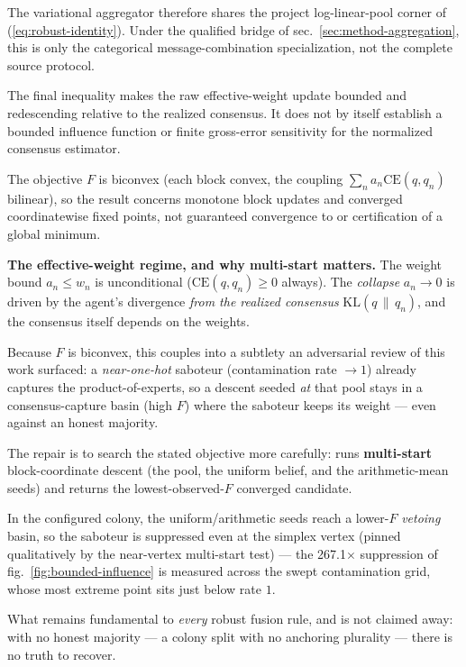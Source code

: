 \documentclass[
  english,
]{article}
\theoremstyle{plain}
\theoremstyle{definition}
\theoremstyle{remark}
\theoremstyle{definition}
\begin{document}
The variational aggregator therefore shares the project log-linear-pool
corner of (\ref{eq:robust-identity}). Under the qualified bridge of
sec.~\ref{sec:method-aggregation}, this is only the categorical
message-combination specialization, not the complete source protocol.

The final inequality makes the raw effective-weight update bounded and
redescending relative to the realized consensus. It does not by itself
establish a bounded influence function or finite gross-error sensitivity
for the normalized consensus estimator.

The objective \(F\) is biconvex (each block convex, the coupling
\(\sum_n a_n\mathrm{CE}(q,q_n)\) bilinear), so the result concerns
monotone block updates and converged coordinatewise fixed points, not
guaranteed convergence to or certification of a global minimum.

\textbf{The effective-weight regime, and why multi-start matters.} The
weight bound \(a_n \le w_n\) is unconditional
(\(\mathrm{CE}(q,q_n)\ge 0\) always). The \emph{collapse} \(a_n \to 0\)
is driven by the agent's divergence \emph{from the realized consensus}
\(\mathrm{KL}(q\,\|\,q_n)\), and the consensus itself depends on the
weights.

Because \(F\) is biconvex, this couples into a subtlety an adversarial
review of this work surfaced: a \emph{near-one-hot} saboteur
(contamination rate \(\to 1\)) already captures the product-of-experts,
so a descent seeded \emph{at} that pool stays in a consensus-capture
basin (high \(F\)) where the saboteur keeps its weight --- even against
an honest majority.

The repair is to search the stated objective more carefully:
 runs \textbf{multi-start}
block-coordinate descent (the pool, the uniform belief, and the
arithmetic-mean seeds) and returns the lowest-observed-\(F\) converged
candidate.

In the configured colony, the uniform/arithmetic seeds reach a
lower-\(F\) \emph{vetoing} basin, so the saboteur is suppressed even at
the simplex vertex (pinned qualitatively by the near-vertex multi-start
test) --- the 267.1\(\times\) suppression of
fig.~\ref{fig:bounded-influence} is measured across the swept
contamination grid, whose most extreme point sits just below rate \(1\).

What remains fundamental to \emph{every} robust fusion rule, and is not
claimed away: with no honest majority --- a colony split with no
anchoring plurality --- there is no truth to recover.
\end{document}
